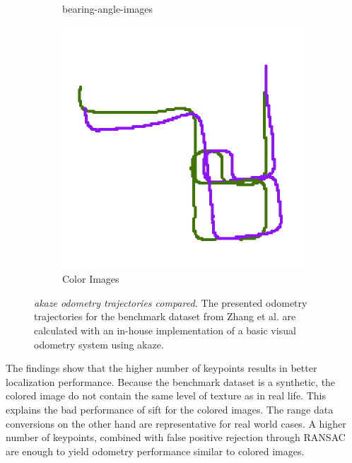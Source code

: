 \begin{figure}[b!]
\begin{subfigure}[t]{0.31\linewidth}
    \caption{\glspl{bearing-angle-image}}
\end{subfigure}%
\begin{subfigure}[t]{0.31\linewidth}
    \includegraphics[width=\linewidth]{chapter06/odo/zhang_pinhole_AKAZE_nice.png}%
    \caption{Color Images}
\end{subfigure}
\caption[\acrshort{akaze} odometry trajectories compared]{\emph{\acrshort{akaze} odometry trajectories compared.} The presented odometry trajectories for the benchmark dataset from Zhang et al.\cite{zhang_icra2016} are calculated with an in-house implementation of a basic visual odometry system using \acrshort{akaze}.}\label{fig:akaze_odometry}
\end{figure}
The findings show that the higher number of keypoints results in better localization performance.
Because the benchmark dataset is a synthetic, the colored image do not contain the same level of texture as in real life.
This explains the bad performance of \acrshort{sift} for the colored images.
The range data conversions on the other hand are representative for real world cases.
A higher number of keypoints, combined with false positive rejection through \acrshort{RANSAC} are enough to yield odometry performance similar to colored images.
